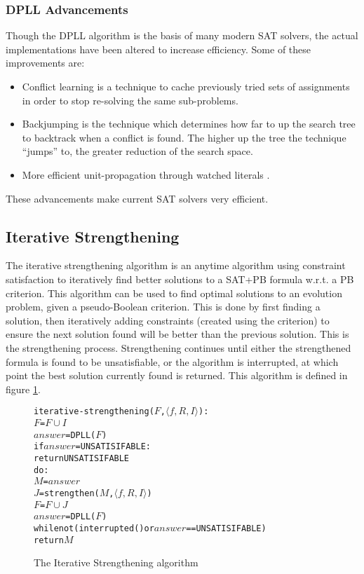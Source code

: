 \subsubsection{DPLL Advancements}
Though the DPLL algorithm is the basis of many modern SAT solvers, the actual implementations have been altered to increase efficiency.
Some of these improvements are:
\begin{itemize}
  \item Conflict learning \citep{stallman1976,sorensson2009} is a technique to cache previously tried sets of assignments in order to stop re-solving the same sub-problems.
	\item Backjumping \citep{Gaschnig1979} is the technique which determines how far to up the search tree to backtrack when a conflict is found.
The higher up the tree the technique ``jumps'' to, the greater reduction of the search space.
\item  More efficient unit-propagation through watched literals \citep{Madigan2001,Moskewicz2001}.
\end{itemize}
These advancements make current SAT solvers very efficient.

\subsection{Iterative Strengthening}
The iterative strengthening algorithm  \citep{calistri1994iterative, le2010sat4j} 
is an anytime algorithm using constraint satisfaction to iteratively find better solutions to a SAT+PB formula w.r.t. a PB criterion.
This algorithm can be used to find optimal solutions to an evolution problem, given a pseudo-Boolean criterion.
This is done by first finding a solution, then iteratively adding constraints (created using the criterion) to ensure the next solution found will be better than the previous solution.
This is the strengthening process.
Strengthening continues until either the strengthened formula is found to be unsatisfiable, or the algorithm is interrupted, at which point the best solution currently found is returned. 
This algorithm is defined in figure \ref{impl.strength}.

\begin{figure}[htp]
\begin{center}
\begin{alltt}
iterative-strengthening(\(F\),\(\langle f, R, I \rangle\)):
    \(F\) = \(F \cup I\)
    \(answer\) = DPLL(\(F\))
    if \(answer\) = UNSATISIFABLE:
        return UNSATISIFABLE
    do:
        \(M\) = \(answer\)
        \(J\) = strengthen(\(M\),\(\langle f, R, I \rangle\))
        \(F\) = \(F \cup J\)
        \(answer\) = DPLL(\(F\))
    while not (interrupted() or  \(answer\) == UNSATISIFABLE)
    return \(M\) 
\end{alltt}
  \caption{The Iterative Strengthening algorithm}
  \label{impl.strength}
\end{center}
\end{figure}

